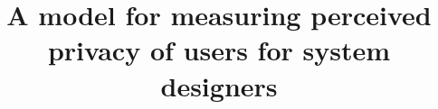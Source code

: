 \documentclass[conference]{IEEEtran}
\begin{document}
%
\title{%
A model for measuring perceived privacy of users for system designers }






% 




\end{document}
